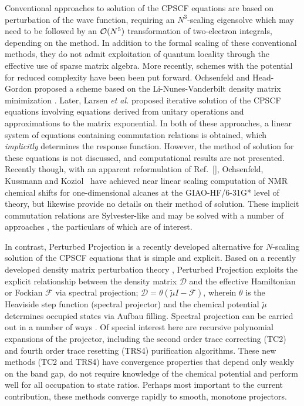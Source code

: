 \documentclass[prl,aps,preprint,showpacs,superbib]{revtex4}
\begin{document}
Conventional approaches to solution of the CPSCF equations 
\cite{HSekino86,SKarna91,JPople79} are based on perturbation of the wave 
function, requiring an $N^3$-scaling eigensolve which may need to be followed by an ${\cal O}(N^5)$ 
transformation of two-electron integrals, depending on the method. 
In addition to the formal scaling of these conventional methods, they do not admit exploitation 
of quantum locality through the effective use of sparse matrix algebra.  
More recently, schemes with the potential for reduced complexity have been been put forward.
Ochsenfeld and Head-Gordon proposed a scheme based on the Li-Nunes-Vanderbilt 
density matrix minimization \cite{Ochsenfeld97}.  Later, Larsen {\em et al.} \cite{HLarsen01a} 
proposed iterative solution of the CPSCF equations involving equations derived from 
unitary operations and approximations to the matrix exponential.    In both of these approaches, 
a linear system of equations containing commutation relations is obtained, which {\em implicitly}
determines the response function.  However, the method of solution for these equations
is not discussed, and computational results are not presented.  Recently though, 
with an apparent reformulation of Ref.~[],
Ochsenfeld, Kussmann and Koziol~\cite{COchsenfeld04} have achieved near linear scaling computation
of NMR chemical shifts for one-dimensional alcanes at the GIAO-HF/6-31G* level of theory,
but likewise provide no details on their method of solution.  These implicit commutation relations are Sylvester-like
and may be solved with a number of approaches \cite{JBrandts01}, the particulars of which are of interest. 

In contrast, Perturbed Projection \cite{VWeber04} is a recently developed alternative 
for $N$-scaling solution of the CPSCF equations that is simple and explicit.  Based on a recently developed density 
matrix perturbation theory \cite{ANiklasson04}, Perturbed Projection exploits the explicit 
relationship between the density matrix $\mathcal{D}$ and the effective Hamiltonian or 
Fockian $\mathcal{F}$ via spectral projection; $\mathcal{D}=\theta(\tilde{\mu}I-\mathcal{F})$, 
wherein $\theta$ is the Heaviside step function (spectral projector)  and the chemical potential 
$\tilde{\mu}$ determines occupied states via Aufbau filling.   Spectral projection can be carried 
out in a number of ways \cite{ANiklasson02A,ANiklasson03,RMcWeeny60,WClinton69,APalser98,GBeylkin99,KNemeth00,AHolas01}.
Of special interest here are recursive polynomial expansions of the projector, including the second 
order trace correcting (TC2) \cite{ANiklasson02A} and fourth order trace resetting (TRS4) 
\cite{ANiklasson03} purification algorithms.  These new methods (TC2 and TRS4) have convergence 
properties that depend only weakly on the band gap, do not require knowledge of the chemical potential 
and perform well for all occupation to state ratios. 
Perhaps most important to the current contribution, these methods converge rapidly to smooth, 
monotone projectors.
\end{document}
